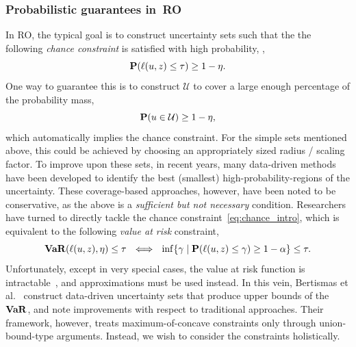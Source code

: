 \subsubsection{Probabilistic guarantees in~\gls{RO}}
In \gls{RO}, the typical goal is to construct uncertainty sets such that the
the following {\it chance constraint} is satisfied with high probability, \ie,
\begin{equation*}
  \label{eq:chance_intro}
  {\mathbf P} (\ell(u,z) \leq \tau ) \geq 1 - \eta.
\end{equation*}
One way to guarantee this is to construct $\mathcal{U}$ to cover a large enough percentage of the probability mass,
$${\mathbf P}(u\in\mathcal{U}) \geq 1 - \eta,$$
which automatically implies the chance constraint. For the simple sets mentioned above, this could be achieved by choosing an appropriately sized radius / scaling factor. 
To improve upon these sets, in recent years, many data-driven methods have been developed to identify the best (smallest) high-probability-regions of the uncertainty.
These coverage-based approaches, however, have been noted to be conservative, as the above is a {\it sufficient but not necessary} condition. Researchers have turned to directly tackle the chance constraint~\eqref{eq:chance_intro}, which is equivalent to the following {\it value at risk} constraint,
\begin{equation*}
\mathop{\bf VaR}(\ell(u,z),\eta)\leq \tau~~\Longleftrightarrow~~ \inf\{\gamma \mid {\mathbf P}(\ell(u,z) \leq \gamma) \geq 1-\alpha\} \leq \tau.
\end{equation*}
Unfortunately, except in very special cases, the value at risk function is intractable~\citep{cvaropt}, and approximations must be used instead.
In this vein, Bertismas et al.~\cite{bertsimas_data-driven_2018} construct data-driven uncertainty sets that produce upper bounds of the $\mathop{\bf VaR}$, and note improvements with respect to traditional approaches. Their framework, however, treats maximum-of-concave constraints only through union-bound-type arguments.
Instead, we wish to consider the constraints holistically.

